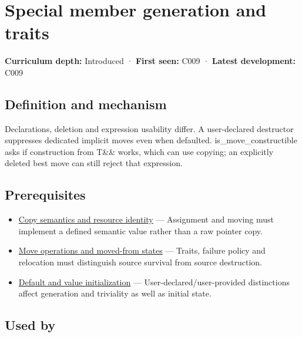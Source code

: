 \hypertarget{appendix-42e02a12c694}{}\label{referencestart:appendix-42e02a12c694}
\section{Special member generation and traits}\label{appendix-42e02a12c694-special-member-generation-and-traits}

\textbf{Curriculum depth:} Introduced · \textbf{First seen:} C009 · \textbf{Latest development:} C009

\begin{allmightroledefinition}

\subsection{Definition and mechanism}\label{appendix-42e02a12c694-definition-and-mechanism}

Declarations, deletion and expression usability differ. A user-declared destructor suppresses dedicated implicit moves even when defaulted. is\_move\_constructible asks if construction from T\&\& works, which can use copying; an explicitly deleted best move can still reject that expression.

\end{allmightroledefinition}

\subsection{Prerequisites}\label{appendix-42e02a12c694-prerequisites}

\begin{itemize}
\tightlist
\item
  \hyperref[appendix-1340cd1ce582]{Copy semantics and resource identity} --- Assignment and moving must implement a defined semantic value rather than a raw pointer copy.
\item
  \hyperref[appendix-5636651017c2]{Move operations and moved-from states} --- Traits, failure policy and relocation must distinguish source survival from source destruction.
\item
  \hyperref[appendix-ba8c1a9fe03f]{Default and value initialization} --- User-declared/user-provided distinctions affect generation and triviality as well as initial state.
\end{itemize}

\subsection{Used by}\label{appendix-42e02a12c694-used-by}

